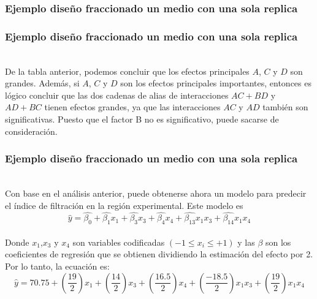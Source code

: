 \documentclass[12pt]{beamer}
\begin{document}
\begin{frame}
\frametitle{Ejemplo diseño fraccionado un medio con una sola replica}
\begin{table}[H]
  \centering
  \caption{Estimaciones de los efectos y los alias}
  \label{tab:addlabel}%
\end{table}%
\end{frame}

\begin{frame}
\frametitle{Ejemplo diseño fraccionado un medio con una sola replica}
~\\De la tabla anterior, podemos concluir que los efectos principales $A$, $C$ y $D$ son grandes. Además, si $A$, $C$ y $D$ son los efectos principales importantes, entonces es lógico concluir que las dos cadenas de alias de interacciones $AC+BD$ y $AD+BC$ tienen efectos grandes, ya que las interacciones $AC$ y $AD$ también son significativas. Puesto que el factor B no es significativo, puede sacarse de consideración.
\end{frame}

\begin{frame}
\frametitle{Ejemplo diseño fraccionado un medio con una sola replica}
~\\Con base en el análisis anterior, puede obtenerse ahora un modelo para predecir el índice de filtración en la región experimental. Este modelo es
$$\hat{y}=\hat{\beta_0}+\hat{\beta_1}x_1+\hat{\beta_3}x_3+\hat{\beta_4}x_4+\hat{\beta_{13}}x_1x_3+\hat{\beta_{14}}x_1x_4$$
~\\Donde $x_1$,$x_3$ y $x_4$ son variables codificadas $(-1\leq x_i\leq +1)$ y las $\beta$ son los coeficientes de regresión que se obtienen dividiendo la estimación del efecto por 2. Por lo tanto, la ecuación es:
$$\hat{y}=70.75+\left(\frac{19}{2}\right)x_1+\left(\frac{14}{2}\right)x_3+\left(\frac{16.5}{2}\right)x_4+\left(\frac{-18.5}{2}\right)x_1x_3+\left(\frac{19}{2}\right)x_1x_4$$

\end{frame}
\end{document}
